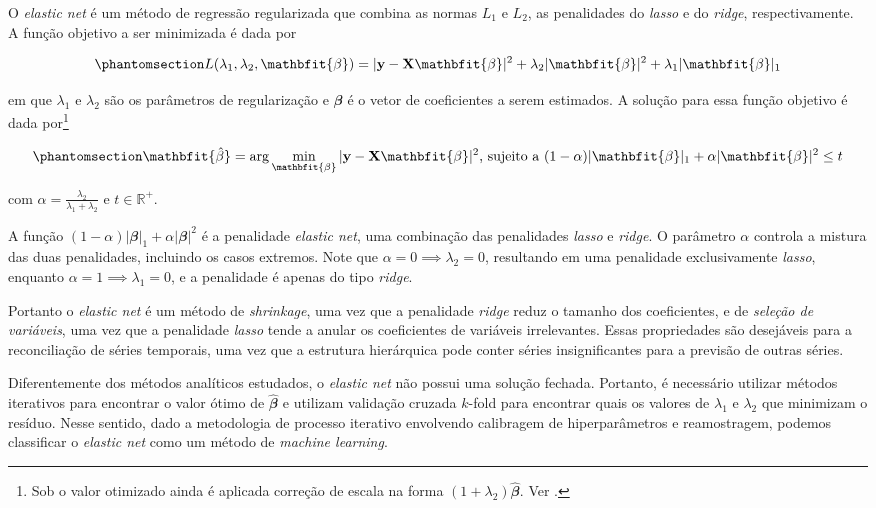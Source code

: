 \begin{apendicesenv}
O \emph{elastic net} \autocite{zou_regularization_2005} é um método de
regressão regularizada que combina as normas \(L_1\) e \(L_2\), as
penalidades do \emph{lasso} e do \emph{ridge}, respectivamente. A função
objetivo a ser minimizada é dada por

\begin{equation}\phantomsection\label{eq-elastic_net}{
L(\lambda_1, \lambda_2, \mathbfit{\beta}) = |\mathbf{y} - \mathbf{X}\mathbfit{\beta}|^2 + \lambda_2|\mathbfit{\beta}|^2 + \lambda_1|\mathbfit{\beta}|_1
}\end{equation}

\noindent em que \(\lambda_1\) e \(\lambda_2\) são os parâmetros de
regularização e \(\mathbfit{\beta}\) é o vetor de coeficientes a serem
estimados. A solução para essa função objetivo é dada por\footnote{Sob o
  valor otimizado ainda é aplicada correção de escala na forma
  \((1+\lambda_2)\mathbfit{\hat{\beta}}\). Ver
  \textcite{zou_regularization_2005}.}

\begin{equation}\phantomsection\label{eq-elastic_net_solution}{
\mathbfit{\hat{\beta}} = \arg \min_{\mathbfit{\beta}} |\mathbf{y}-\mathbf{X}\mathbfit{\beta}|^2 \text{, sujeito a } (1-\alpha)|\mathbfit{\beta}|_1 + \alpha|\mathbfit{\beta}|^2 \leq t
}\end{equation}

\noindent com \(\alpha = \frac{\lambda_2}{\lambda_1 + \lambda_2}\) e
\(t \in \mathbb{R}^+\).

A função \((1-\alpha)|\mathbfit{\beta}|_1 + \alpha|\mathbfit{\beta}|^2\)
é a penalidade \emph{elastic net}, uma combinação das penalidades
\emph{lasso} e \emph{ridge}. O parâmetro \(\alpha\) controla a mistura
das duas penalidades, incluindo os casos extremos. Note que
\(\alpha = 0 \implies \lambda_2 = 0\), resultando em uma penalidade
exclusivamente \emph{lasso}, enquanto
\(\alpha = 1 \implies \lambda_1 = 0\), e a penalidade é apenas do tipo
\emph{ridge}.

Portanto o \emph{elastic net} é um método de \emph{shrinkage}, uma vez
que a penalidade \emph{ridge} reduz o tamanho dos coeficientes, e de
\emph{seleção de variáveis}, uma vez que a penalidade \emph{lasso} tende
a anular os coeficientes de variáveis irrelevantes. Essas propriedades
são desejáveis para a reconciliação de séries temporais, uma vez que a
estrutura hierárquica pode conter séries insignificantes para a previsão
de outras séries.

Diferentemente dos métodos analíticos estudados, o \emph{elastic net}
não possui uma solução fechada. Portanto, é necessário utilizar métodos
iterativos para encontrar o valor ótimo de \(\mathbfit{\hat{\beta}}\) e
\textcite{zou_regularization_2005} utilizam validação cruzada \(k\)-fold
para encontrar quais os valores de \(\lambda_1\) e \(\lambda_2\) que
minimizam o resíduo. Nesse sentido, dado a metodologia de processo
iterativo envolvendo calibragem de hiperparâmetros e reamostragem,
podemos classificar o \emph{elastic net} como um método de \emph{machine
learning}.


\end{apendicesenv}
